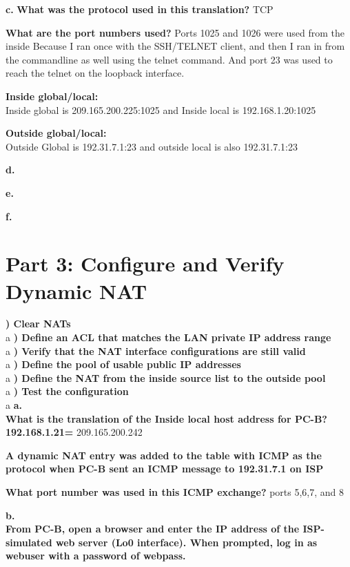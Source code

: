 \documentclass{report}
\newcommand{\mysection}[1]{\section*{#1}}
\newcommand{\mysubsection}[2]{\textbf{\romannumeral #1) #2}}
\begin{document}
{\bf{c.}}
{\bf{What was the protocol used in this translation?}} TCP


{\bf{What are the port numbers used?}} Ports 1025 and 1026 were used from the
inside Because I ran once with the SSH/TELNET client, and then I ran in from
the commandline as well using the telnet command. And port 23 was used to reach the telnet on the loopback interface.

{\bf{Inside global/local:}}\\
Inside global is 209.165.200.225:1025 and Inside local is 192.168.1.20:1025


{\bf{Outside global/local:}}\\
Outside Global is 192.31.7.1:23 and outside local is also 192.31.7.1:23

{\bf{d.}}

{\bf{e.}}

{\bf{f.}}



\mysection{\textbf{Part 3: Configure and Verify Dynamic NAT }}

\mysubsection{1}{Clear NATs}\\
a
\noindent\mysubsection{2}{Define an ACL that matches the LAN private IP address
range}\\
a
\noindent\mysubsection{3}{Verify that the NAT interface configurations are
still valid}\\
a
\noindent\mysubsection{4}{Define the pool of usable public IP addresses}\\
a
\noindent\mysubsection{5}{Define the NAT from the inside source list to the
outside pool}\\
a
\noindent\mysubsection{6}{Test the configuration}\\
a
{\bf{a.}}\\
{\bf{What is the translation of the Inside local host address for PC-B?}}
{\bf{192.168.1.21=}} 209.165.200.242


{\bf{A dynamic NAT entry was added to the table with ICMP as the protocol when PC-B sent an ICMP
message to 192.31.7.1 on ISP}}


{\bf{What port number was used in this ICMP exchange?}} ports 5,6,7, and 8


{\bf{b.}}\\
{\bf{From PC-B, open a browser and enter the IP address of the ISP-simulated web server (Lo0 interface).
When prompted, log in as webuser with a password of webpass.}}
\end{document}
